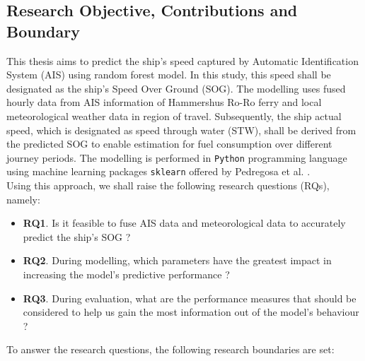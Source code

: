 \newpage

\subsection{Research Objective, Contributions and Boundary}\label{objectives}

This thesis aims to predict the ship's speed captured by Automatic Identification System (AIS) using random forest model. In this study, this speed shall be designated as the ship's Speed Over Ground (SOG). The modelling uses fused hourly data from AIS information of Hammershus Ro-Ro ferry and local meteorological weather data in region of travel. Subsequently, the ship actual speed, which is designated as speed through water (STW), shall be derived from the predicted SOG to enable estimation for fuel consumption over different journey periods. The modelling is performed in {\tt Python} programming language using machine learning packages {\tt sklearn} offered by Pedregosa et al. \cite{FabianPedregosa.2011}. \\

Using this approach, we shall raise the following research questions (RQs), namely:

\begin{itemize}
    \item \textbf{RQ1}. Is it feasible to fuse AIS data and meteorological data to accurately predict the ship's SOG ?
    \item \textbf{RQ2}. During modelling, which parameters have the greatest impact in increasing the model's predictive performance ?
    \item \textbf{RQ3}. During evaluation, what are the performance measures that should be considered to help us gain the most information out of the model's behaviour ?
\end{itemize} 

To answer the research questions, the following research boundaries are set:

